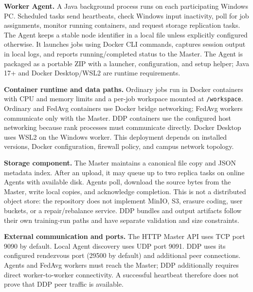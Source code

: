 \documentclass{article}
\begin{document}
\textbf{Worker Agent.} A Java background process runs on each participating Windows PC. Scheduled tasks send heartbeats, check Windows input inactivity, poll for job assignments, monitor running containers, and request storage replication tasks. The Agent keeps a stable node identifier in a local file unless explicitly configured otherwise. It launches jobs using Docker CLI commands, captures session output in local logs, and reports running/completed status to the Master. The Agent is packaged as a portable ZIP with a launcher, configuration, and setup helper; Java 17+ and Docker Desktop/WSL2 are runtime requirements.

\textbf{Container runtime and data paths.} Ordinary jobs run in Docker containers with CPU and memory limits and a per-job workspace mounted at \texttt{/workspace}. Ordinary and FedAvg containers use Docker bridge networking; FedAvg workers communicate only with the Master. DDP containers use the configured host networking because rank processes must communicate directly. Docker Desktop uses WSL2 on the Windows worker. This deployment depends on installed versions, Docker configuration, firewall policy, and campus network topology.

\textbf{Storage component.} The Master maintains a canonical file copy and JSON metadata index. After an upload, it may queue up to two replica tasks on online Agents with available disk. Agents poll, download the source bytes from the Master, write local copies, and acknowledge completion. This is not a distributed object store: the repository does not implement MinIO, S3, erasure coding, user buckets, or a repair/rebalance service. DDP bundles and output artifacts follow their own training-run paths and have separate validation and size constraints.

\textbf{External communication and ports.} The HTTP Master API uses TCP port 9090 by default. Local Agent discovery uses UDP port 9091. DDP uses its configured rendezvous port (29500 by default) and additional peer connections. Agents and FedAvg workers must reach the Master; DDP additionally requires direct worker-to-worker connectivity. A successful heartbeat therefore does not prove that DDP peer traffic is available.
\end{document}
